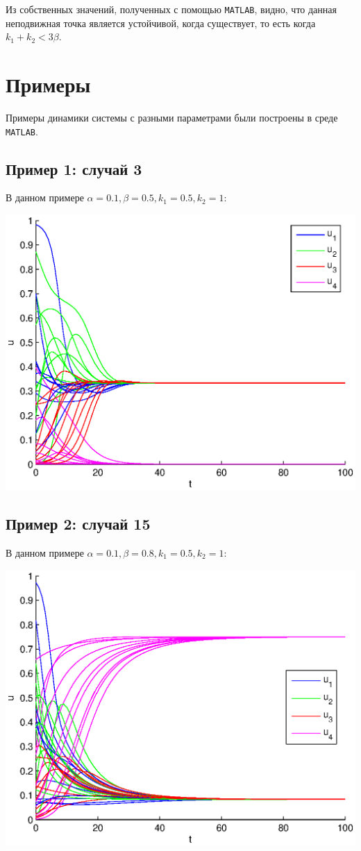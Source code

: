 \documentclass[12pt]{article}
\theoremstyle{rusdef}
\begin{document}

	Из собственных значений, полученных с помощью \texttt{MATLAB}, видно, что данная неподвижная точка является устойчивой, когда существует, то есть когда $k_1 + k_2 < 3\beta$.

	\section{Примеры}
	
	Примеры динамики системы с разными параметрами были построены в среде \texttt{MATLAB}.
	\subsection{Пример 1: случай 3}

	В данном примере $\alpha = 0.1, \beta = 0.5, k_1 = 0.5, k_2 = 1$:
	
	\includegraphics{pics/3.eps}

	\subsection{Пример 2: случай 15}
	
	В данном примере $\alpha = 0.1, \beta = 0.8, k_1 = 0.5, k_2 = 1$:
	
	\includegraphics{pics/15.eps}
\end{document}
